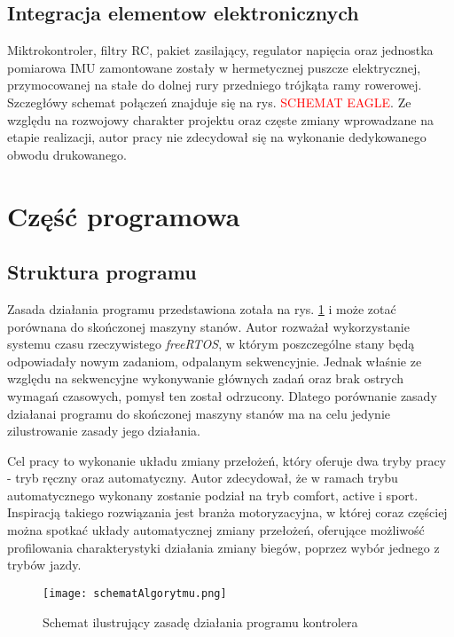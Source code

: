 \subsection{Integracja elementow elektronicznych}
Miktrokontroler, filtry RC, pakiet zasilający, regulator napięcia oraz jednostka pomiarowa IMU zamontowane zostały w hermetycznej puszcze elektrycznej, przymocowanej na stałe do dolnej rury przedniego trójkąta ramy rowerowej. Szczegłówy schemat połączeń znajduje się na rys. \textcolor{red}{SCHEMAT EAGLE}. Ze względu na rozwojowy charakter projektu oraz częste zmiany wprowadzane na etapie realizacji, autor pracy nie zdecydował się na wykonanie dedykowanego obwodu drukowanego.

\section{Część programowa}
\subsection{Struktura programu}
Zasada działania programu przedstawiona zotała na rys. \ref{fig:schematAlgorytmu} i może zotać porównana do skończonej maszyny stanów. Autor rozważał wykorzystanie systemu czasu rzeczywistego \textit{freeRTOS}, w którym poszczególne stany będą odpowiadały nowym zadaniom, odpalanym sekwencyjnie. Jednak właśnie ze względu na sekwencyjne wykonywanie głównych zadań oraz brak ostrych wymagań czasowych, pomysł ten został odrzucony. Dlatego porównanie zasady działanai programu do skończonej maszyny stanów ma na celu jedynie zilustrowanie zasady jego działania.

Cel pracy to wykonanie układu zmiany przełożeń, który oferuje dwa tryby pracy - tryb ręczny oraz automatyczny. Autor zdecydował, że w ramach trybu automatycznego wykonany zostanie podział na tryb comfort, active i sport. Inspiracją  takiego rozwiązania jest branża motoryzacyjna, w której coraz częściej można spotkać układy automatycznej zmiany przełożeń, oferujące możliwość profilowania charakterystyki działania zmiany biegów, poprzez wybór jednego z trybów jazdy.
\begin{figure}[h]
    \centering
    \texttt{[image: schematAlgorytmu.png]}
    \caption{Schemat ilustrujący zasadę działania programu kontrolera}
    \label{fig:schematAlgorytmu}
\end{figure}
